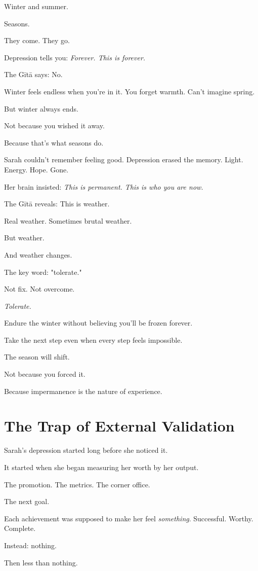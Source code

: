 \documentclass[11pt,twoside]{book}
\begin{document}
Winter and summer.

Seasons.

They come. They go.

Depression tells you: \textit{Forever. This is forever.}

The Gītā says: No.

Winter feels endless when you're in it. You forget warmth. Can't imagine spring.

But winter always ends.

Not because you wished it away.

Because that's what seasons do.

Sarah couldn't remember feeling good. Depression erased the memory. Light. Energy. Hope. Gone.

Her brain insisted: \textit{This is permanent. This is who you are now.}

The Gītā reveals: This is weather.

Real weather. Sometimes brutal weather.

But weather.

And weather changes.

The key word: "tolerate."

Not fix. Not overcome.

\textit{Tolerate.}

Endure the winter without believing you'll be frozen forever.

Take the next step even when every step feels impossible.

The season will shift.

Not because you forced it.

Because impermanence is the nature of experience.

\section*{The Trap of External Validation}

Sarah's depression started long before she noticed it.

It started when she began measuring her worth by her output.

The promotion. The metrics. The corner office.

The next goal.

Each achievement was supposed to make her feel \textit{something}. Successful. Worthy. Complete.

Instead: nothing.

Then less than nothing.
\end{document}
